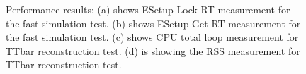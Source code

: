 \documentclass[12pt]{iopart}
\begin{document}
\begin{figure}[h]
\begin{minipage}{.48\textwidth}
\end{minipage}
\begin{minipage}{.48\textwidth}
\end{minipage}\hfill
\begin{minipage}{.48\textwidth}
 \end{minipage}
 \caption{Performance results: (a) shows ESetup Lock RT measurement for the fast simulation test. (b) shows ESetup Get RT measurement for the fast simulation test. (c) shows CPU total loop measurement for TTbar reconstruction test. (d) is showing the RSS measurement for TTbar reconstruction test.}
\label{fig:performance1}
\end{figure}
\end{document}
